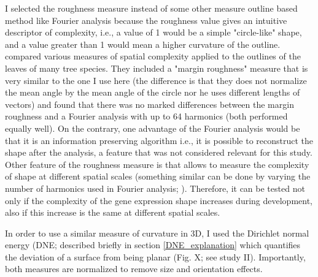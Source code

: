 I selected the roughness measure instead of some other measure outline based method like Fourier analysis because the roughness value gives an intuitive descriptor of complexity, i.e., a value of 1 would be a simple "circle-like" shape, and a value greater than 1 would mean a higher curvature of the outline. \citet{McLellan1998} compared various measures of spatial complexity applied to the outlines of the leaves of many tree species. They included a "margin roughness" measure that is very similar to the one I use here (the difference is that they does not normalize the mean angle by the mean angle of the circle nor he uses different lengths of vectors) and found that there was no marked differences between the margin roughness and a Fourier analysis with up to 64 harmonics (both performed equally well).
On the contrary, one advantage of the Fourier analysis would be that it is an information preserving algorithm \citep{Pavlidis1980} i.e., it is possible to reconstruct the shape after the analysis, a feature that was not considered relevant for this study. Other feature of the roughness measure is that allows to measure the complexity of shape at different spatial scales (something similar can be done by varying the number of harmonics used in Fourier analysis; \citealp{McLellan1998}). Therefore, it can be tested not only if the complexity of the gene expression shape increases during development, also if this increase is the same at different spatial scales.

In order to use a similar measure of curvature in 3D, I used the Dirichlet normal energy (DNE; described briefly in section \ref{DNE_explanation} which quantifies the deviation of a surface from being planar (Fig. X; see study II).
Importantly, both measures are normalized to remove size and orientation effects.

